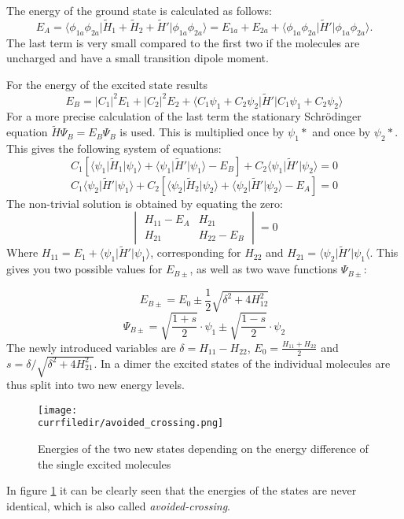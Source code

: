 The energy of the ground state is calculated as follows:
\begin{equation}
    E_A = \langle\phi_{1a}\phi_{2a}\lvert\tilde{H}_1+\tilde{H}_2+\tilde{H}'\rvert\phi_{1a}\phi_{2a}\rangle = E_{1a}+E_{2a}+\langle\phi_{1a}\phi_{2a}\lvert\tilde{H}'\rvert\phi_{1a}\phi_{2a}\rangle.
\end{equation}
The last term is very small compared to the first two if the molecules are uncharged and have a small transition dipole moment.

For the energy of the excited state results
\begin{equation}
    E_B = \lvert C_1\rvert^2 E_1 + \lvert C_2\rvert^2 E_2 + \langle C_1\psi_1 + C_2\psi_2\lvert\tilde{H}'\rvert C_1\psi_1 + C_2\psi_2\rangle
\end{equation}
For a more precise calculation of the last term the stationary Schrödinger equation $\tilde{H}\Psi_B = E_B\Psi_B$ is used. This is multiplied once by $\psi_1*$ and once by $\psi_2*$. This gives the following system of equations:
\[ C_1 \left [\langle\psi_1\lvert\tilde{H}_1\rvert\psi_1\rangle+\langle\psi_1\lvert\tilde{H}'\rvert\psi_1\rangle - E_B\right] + C_2\langle\psi_1\lvert\tilde{H}'\rvert\psi_2\rangle = 0 \]
\[ C_1\langle\psi_2\lvert\tilde{H}'\rvert\psi_1\rangle + C_2 \left [\langle\psi_2\lvert\tilde{H}_2\rvert\psi_2\rangle+\langle\psi_2\lvert\tilde{H}'\rvert\psi_2\rangle - E_A\right] = 0 \]
The non-trivial solution is obtained by equating the zero:
\[ \begin{vmatrix}
    H_{11} - E_A & H_{21} \\
    H_{21} & H_{22} - E_B
   \end{vmatrix} = 0 \] 
Where $H_{11}=E_1+\langle\psi_1\lvert\tilde{H}'\rvert\psi_1\rangle$, corresponding for $H_{22}$ and $H_{21}=\langle\psi_2\lvert\tilde{H}'\rvert\psi_1\langle$. This gives you two possible values for $E_{B\pm}$, as well as two wave functions $\Psi_{B\pm}$:

\begin{equation}
    E_{B\pm} = E_0 \pm \frac{1}{2}\sqrt{\delta^2 + 4H_{12}^2}  
\end{equation}
\begin{equation}
    \Psi_{B\pm} = \sqrt{\frac{1+s}{2}}\cdot\psi_1 \pm \sqrt{\frac{1-s}{2}}\cdot\psi_2
\end{equation}
The newly introduced variables are $\delta = H_{11}-H_{22}$, $E_0 = \frac{H_{11}+H_{22}}{2}$ and $s = \delta/\sqrt{\delta^2+4H_{21}^2}$. In a dimer the excited states of the individual molecules are thus split into two new energy levels.
\begin{figure}
    \centering
    \texttt{[image: \\currfiledir/avoided\_crossing.png]}
    \caption{Energies of the two new states depending on the energy difference of the single excited molecules}
    \label{avoided_crossing}
\end{figure}
In figure \ref{avoided_crossing} it can be clearly seen that the energies of the states are never identical, which is also called \textit{avoided-crossing}.

